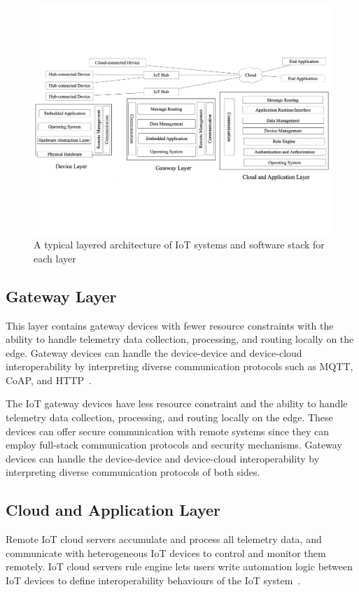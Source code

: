  \begin{figure}[t]
  \centering 
   \includegraphics[width=\linewidth]{./imgs/arch1.pdf}
  \caption{A typical layered architecture of IoT systems and software stack for each layer}
  \label{fig:arch}
\end{figure}

\subsection{Gateway Layer}
This layer contains gateway devices with fewer resource constraints with the ability to handle telemetry data collection, processing, and routing locally on the edge. Gateway devices can handle the device-device and device-cloud interoperability by interpreting diverse communication protocols such as MQTT, CoAP, and HTTP~\cite{tschofenig2014architectural}. 

The IoT gateway devices have less resource constraint and the ability to handle telemetry data collection, processing, and routing locally on the edge. These devices can offer secure communication with remote systems since they can employ full-stack communication protocols and security mechanisms\cite{bormann2014terminology}. Gateway devices can handle the device-device and device-cloud interoperability by interpreting diverse communication protocols of both sides\cite{vcolakovic2018IoT}.

\subsection{Cloud and Application Layer}
Remote IoT cloud servers accumulate and process all telemetry data, and communicate with heterogeneous IoT devices to control and monitor them remotely. IoT cloud servers rule engine lets users write automation logic between IoT devices to define interoperability behaviours of the IoT system~\cite{securityUsenix2019}. 

